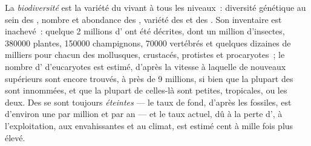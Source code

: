 \begin{definition}[La biodiversité]\label{def:b1:classifying-biodiversity:biodiversity}
La \emph{biodiversité} est la variété du vivant à tous les niveaux~:
diversité génétique au sein des , nombre et abondance des
, variété des  et des . Son inventaire est
inachevé~: quelque \num{2} millions d' ont été décrites, dont un
million d'insectes, \num{380000} plantes, \num{150000} champignons,
\num{70000} vertébrés et quelques dizaines de milliers pour chacun des
mollusques, crustacés, protistes et procaryotes~; le nombre d'
d'eucaryotes est estimé, d'après la vitesse à laquelle de nouveaux
 supérieurs sont encore trouvés, à près de \num{9} millions, si
bien que la plupart des  sont innommées, et que la plupart de
celles-là sont petites, tropicales, ou les deux. Des  se sont
toujours \emph{éteintes} --- le taux de fond, d'après les fossiles, est
d'environ une  par million et par an --- et le taux actuel, dû à
la perte d', à l'exploitation, aux  envahissantes et au
climat, est estimé cent à mille fois plus élevé.
\end{definition}

